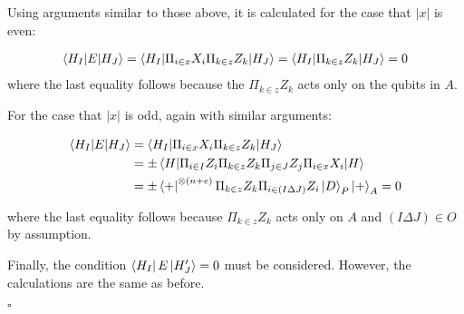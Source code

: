 \documentclass[12pt]{iopart}
\begin{document}
Using arguments similar to those above, it is calculated for the case that $|x|$ is even:

\begin{eqnarray}
\braket{H_I|E|H_J} = \braket{H_I|\Pi_{i \in x} X_i \Pi_{k \in z} Z_k|H_J} = \braket{H_I|\Pi_{k \in z} Z_k|H_J} = 0
\end{eqnarray}
 where the last equality follows because the $\Pi_{k \in z} Z_k$ acts only on the qubits in $A$.

For the case that $|x|$ is odd, again with similar arguments:

\begin{eqnarray}
\braket{H_I|E|H_J} &= \braket{H_I|\Pi_{i \in x} X_i \Pi_{k \in z} Z_k|H_J} \nonumber \\ 
&= \pm \braket{H|\Pi_{i \in I} Z_i\Pi_{k \in z} Z_k\Pi_{j \in J} Z_j\Pi_{i \in x} X_i |H} \nonumber \\ 
&= \pm \bra{+}^{\otimes (n+e)} \Pi_{k \in z} Z_k \Pi_{i \in (I \Delta J)} Z_i \ket{D}_P\ket{+}_A = 0
\end{eqnarray}

where the last equality follows because $\Pi_{k \in z} Z_k$ acts only on $A$ and $(I \Delta J) \in O$ by assumption.

Finally, the condition $\bra{H_I} E \ket{H_J^\prime} = 0$ must be considered. However, the calculations are the same as before.

\begin{flushright}
$\square$
\end{flushright}
\end{document}
